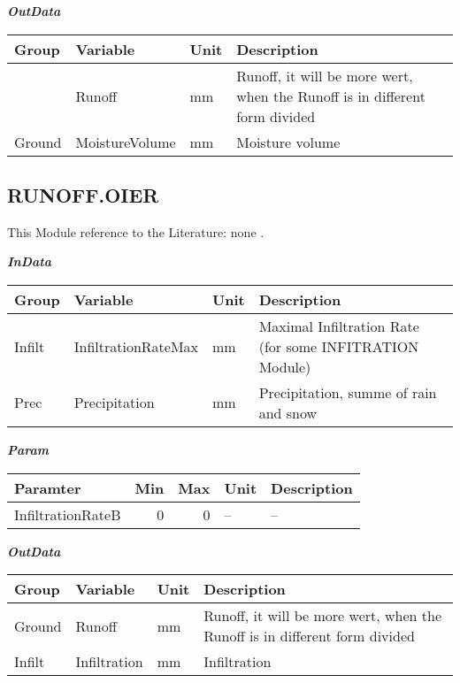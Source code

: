 \documentclass[
]{book}
\begin{document}
\textbf{\emph{OutData}}

\begin{table}[!h]
\centering
\begin{tabular}{l|l|l|l}
\hline
Group & Variable & Unit & Description\\
\hline
 & Runoff & mm & Runoff, it will be more wert, when the Runoff is in different form divided\\
\cline{2-4}
\multirow{-2}{*}{\raggedright\arraybackslash Ground} & MoistureVolume & mm & Moisture volume\\
\hline
\end{tabular}
\end{table}

\hypertarget{runoff.oier}{%
\subsection{RUNOFF.OIER}\label{runoff.oier}}

This Module reference to the Literature: none \citep{none}.

\textbf{\emph{InData}}

\begin{table}[!h]
\centering
\begin{tabular}{l|l|l|l}
\hline
Group & Variable & Unit & Description\\
\hline
Infilt & InfiltrationRateMax & mm & Maximal Infiltration Rate (for some INFITRATION Module)\\
\cline{1-4}
Prec & Precipitation & mm & Precipitation, summe of rain and snow\\
\hline
\end{tabular}
\end{table}

\textbf{\emph{Param}}

\begin{table}[!h]
\centering
\begin{tabular}{l|r|r|l|l}
\hline
Paramter & Min & Max & Unit & Description\\
\hline
InfiltrationRateB & 0 & 0 & -- & --\\
\hline
\end{tabular}
\end{table}

\textbf{\emph{OutData}}

\begin{table}[!h]
\centering
\begin{tabular}{l|l|l|l}
\hline
Group & Variable & Unit & Description\\
\hline
Ground & Runoff & mm & Runoff, it will be more wert, when the Runoff is in different form divided\\
\cline{1-4}
Infilt & Infiltration & mm & Infiltration\\
\hline
\end{tabular}
\end{table}
\end{document}
